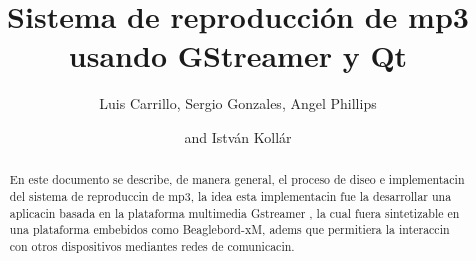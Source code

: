 \documentclass[%
	final,
	reprint,
	notitlepage,
	narroweqnarray,
	inline,
	twoside,
        invited,
	]{ieee}
\begin{document}
\title[Sistema de reproducción de mp3 usando GStreamer y Qt]{%
       Sistema de reproducción de mp3 usando GStreamer y Qt}

\author[PLETT AND KOLL\'{A}R]{Luis Carrillo, Sergio Gonzales, Angel Phillips %
\and{}and Istv\'{a}n Koll\'{a}r
}



\maketitle               

\begin{abstract} 
 En este documento se describe, de manera general, el proceso de diseo e implementacin del sistema de reproduccin de mp3, la idea esta implementacin fue la desarrollar una aplicacin basada en la plataforma multimedia Gstreamer , la cual fuera sintetizable en una plataforma embebidos como Beaglebord-xM, adems que permitiera la interaccin con otros dispositivos mediantes redes de comunicacin.
\end{abstract}
\end{document}
